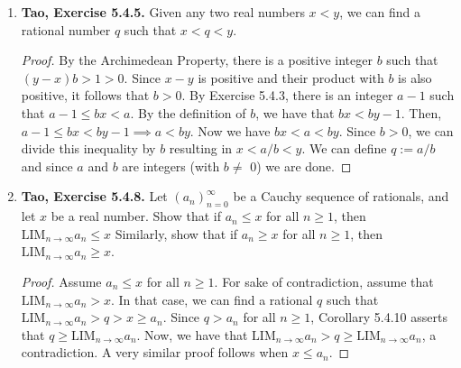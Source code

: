 \documentclass{article}
\newcommand{\exc}[2][Abbott]{\item \textbf{#1, Exercise #2.}}
\begin{document}
\begin{enumerate}
\begin{proof}
							      		      	
		Suppose for sake of contradiction that there is no integer $L < m \leq K$ such that $m/n$ is U.B but that $(m - 1)/n$ is not U.B. This implies that if $m/n$ is U.B, $(m - 1)/n$ must also be U.B (as long as $L < m \leq K$).
		Let $P(t)$ be the statement "$L < K-t \implies$ Both $(K-t)/n$ and $(K-t-1)/n$ are U.B". We will prove $P(t)$ holds for all natural $t$ by induction. First, we need to show that $L < K \implies$ Both $K/n$ and $(K-1)/n$ are U.B. $K/n$ is U.B by assumption, and since $L < K \leq K$, $(K - 1)/n$ also has to be an U.B, again by assumption. Now assume $P(t)$. We need to show that $L < K-t-1 \implies$ Both $(K-t-1)/n$ and $(K-t-2)/n$ are U.B. If $ L \geq K-t-1$, $P(t+1)$ is vacuously true, so we assume $K \geq K-t-1 > L$. Notice that $K-t-1 > L \implies K-t > L$. By the induction hypothesis, $(K-t-1)/n$ is U.B, but this also means that $(K-t-2)/n$ is U.B, as we wanted to show.
							      		      	
		Now, since $K>L$ we have that $K \geq L+1$, which means that $K = L+1+c$ for some natural number $c$. Then $P(c)$ holds and also $L < K- c = L + 1 \leq K$. Therefore $(K-c-1)/n = L/n$ must be U.B, a contradiction.
	\end{proof}
				      	      
	\exc[Tao]{5.4.5} Given any two real numbers $x<y$, we can find a rational number $q$ such that $x<q<y$.
	\begin{proof}
		By the Archimedean Property, there is a positive integer $b$ such that $(y-x)b > 1 > 0$. Since $x-y$ is positive and their product with $b$ is also positive, it follows that $b > 0$. By Exercise 5.4.3, there is an integer $a-1$ such that $a-1 \leq bx < a$. By the definition of $b$, we have that $bx < by - 1$. Then, $a-1 \leq bx < by-1 \implies a < by$. Now we have $bx < a < by$. Since $b > 0$, we can divide this inequality by $b$ resulting in $x < a/b < y$. We can define $q := a/b$ and since $a$ and $b$ are integers (with $b \neq$ 0) we are done.
	\end{proof}
				      	      
	\exc[Tao]{5.4.8} Let $(a_n)_{n=0}^\infty$ be a Cauchy sequence of rationals, and let $x$ be
	a real number. Show that if $a_n \leq x$ for all $n \geq 1$, then $\text{LIM}_{n \to \infty} a_n \leq x$
	Similarly, show that if $a_n \geq x$ for all $n \geq 1$, then $\text{LIM}_{n \to \infty} a_n \geq x$.
				      	      
	\begin{proof}
		Assume $a_n \leq x$ for all $n \geq 1$. For sake of contradiction, assume that $\text{LIM}_{n \to \infty} a_n > x$. In that case, we can find a rational $q$ such that $\text{LIM}_{n \to \infty} a_n > q > x \geq a_n$. Since $q > a_n$ for all $n \geq 1$, Corollary 5.4.10 asserts that $q \geq \text{LIM}_{n \to \infty} a_n$. Now, we have that $\text{LIM}_{n \to \infty} a_n > q \geq \text{LIM}_{n \to \infty} a_n$, a contradiction. A very similar proof follows when $x \leq a_n$.
	\end{proof}
				      	      

\end{enumerate}
\end{document}
